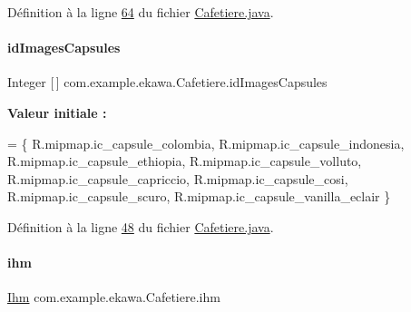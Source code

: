 Définition à la ligne \hyperlink{_cafetiere_8java_source_l00064}{64} du fichier \hyperlink{_cafetiere_8java_source}{Cafetiere.\+java}.

\mbox{\label{classcom_1_1example_1_1ekawa_1_1_cafetiere_a7558b3f423bd53d4198a7c143bd2d657}} 
\paragraph{\texorpdfstring{id\+Images\+Capsules}{idImagesCapsules}}
{\footnotesize\ttfamily Integer \mbox{[}$\,$\mbox{]} com.\+example.\+ekawa.\+Cafetiere.\+id\+Images\+Capsules\hspace{0.3cm}{\ttfamily [private]}}

{\bfseries Valeur initiale \+:}
\begin{DoxyCode}
=
    \{
            R.mipmap.ic\_capsule\_colombia,
            R.mipmap.ic\_capsule\_indonesia,
            R.mipmap.ic\_capsule\_ethiopia,
            R.mipmap.ic\_capsule\_volluto,
            R.mipmap.ic\_capsule\_capriccio,
            R.mipmap.ic\_capsule\_cosi,
            R.mipmap.ic\_capsule\_scuro,
            R.mipmap.ic\_capsule\_vanilla\_eclair
    \}
\end{DoxyCode}


Définition à la ligne \hyperlink{_cafetiere_8java_source_l00048}{48} du fichier \hyperlink{_cafetiere_8java_source}{Cafetiere.\+java}.

\mbox{\label{classcom_1_1example_1_1ekawa_1_1_cafetiere_a7db4a63088834eda5f6a3e951611bf82}} 
\paragraph{\texorpdfstring{ihm}{ihm}}
{\footnotesize\ttfamily \hyperlink{classcom_1_1example_1_1ekawa_1_1_ihm}{Ihm} com.\+example.\+ekawa.\+Cafetiere.\+ihm\hspace{0.3cm}{\ttfamily [private]}}




